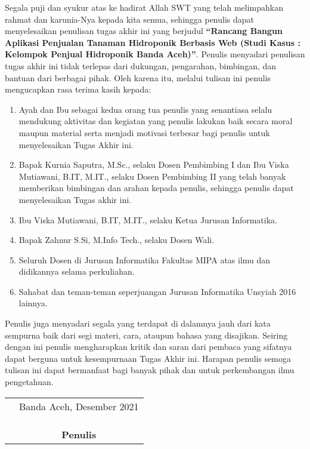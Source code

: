 \preface %


Segala puji dan syukur atas ke hadirat Allah SWT yang telah melimpahkan rahmat dan karunia-Nya kepada kita semua, sehingga penulis dapat menyelesaikan penulisan tugas akhir ini yang berjudul \textbf{“Rancang Bangun Aplikasi Penjualan Tanaman Hidroponik Berbasis Web (Studi Kasus : Kelompok Penjual Hidroponik Banda Aceh)”}. Penulis menyadari penulisan tugas akhir ini tidak terlepas dari dukungan, pengarahan, bimbingan, dan bantuan dari berbagai pihak. Oleh karena itu, melalui tulisan ini penulis mengucapkan rasa terima kasih kepada:

\begin{enumerate}
	\item{Ayah dan Ibu sebagai kedua orang tua penulis yang senantiasa selalu mendukung aktivitas dan kegiatan yang penulis lakukan baik secara moral maupun material serta menjadi motivasi terbesar bagi penulis untuk menyelesaikan Tugas Akhir ini.}
	\item{Bapak Kurnia Saputra, M.Sc., selaku Dosen Pembimbing I dan Ibu Viska Mutiawani, B.IT, M.IT., selaku Dosen Pembimbing II yang telah banyak memberikan bimbingan dan arahan kepada penulis, sehingga penulis dapat menyelesaikan Tugas akhir ini.}
	\item {Ibu Viska Mutiawani, B.IT, M.IT., selaku Ketua Jurusan Informatika.}
	\item{Bapak Zahnur S.Si, M.Info Tech., selaku Dosen Wali.}
	\item{Seluruh Dosen di Jurusan Informatika Fakultas MIPA atas ilmu dan didikannya selama perkuliahan.}
	\item{Sahabat dan teman-teman seperjuangan Jurusan Informatika Unsyiah 2016 lainnya.}
\end{enumerate}


Penulis juga menyadari segala yang terdapat di dalamnya jauh dari kata sempurna baik dari segi materi, cara, ataupun bahasa yang disajikan. Seiring dengan ini penulis mengharapkan kritik dan saran dari pembaca yang sifatnya dapat berguna untuk kesempurnaan Tugas Akhir ini. Harapan penulis semoga tulisan ini dapat bermanfaat bagi banyak pihak dan untuk perkembangan ilmu pengetahuan.

\vspace{1cm}


\begin{tabular}{p{7.5cm}c}
	&Banda Aceh, Desember 2021\\
	&\\
	&\\
	&\\
	&\textbf{Penulis}
\end{tabular}